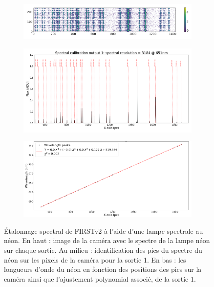 \begin{figure}[ht!]
    \centering
    \begin{subfigure}{0.8\textwidth}
        \includegraphics[width=\textwidth]{Figure_Chap3/20210722_5TC_Y_5InputsSum_Neon.png}
    \end{subfigure}
    \begin{subfigure}{0.8\textwidth}
        \includegraphics[width=\textwidth]{Figure_Chap3/20210722_5TC_PY_SpectralCalFlux01_Neon.png}
    \end{subfigure}
    \begin{subfigure}{0.8\textwidth}
        \includegraphics[width=\textwidth]{Figure_Chap3/20210722_5TC_Y_SpectralCalFitFort01_Neon_Manuscript.png}
    \end{subfigure}
    \caption[Résultat de l'étalonnage spectrale de FIRSTv2 avec une lampe spectrale au néon.]{Étalonnage spectral de FIRSTv2 à l'aide d'une lampe spectrale au néon. En haut : image de la caméra avec le spectre de la lampe néon sur chaque sortie. Au milieu : identification des pics du spectre du néon sur les pixels de la caméra pour la sortie 1. En bas : les longueurs d'onde du néon en fonction des positions des pics sur la caméra ainsi que l'ajustement polynomial associé, de la sortie 1.}
    \label{fig:NeonSpecCal}
\end{figure}


